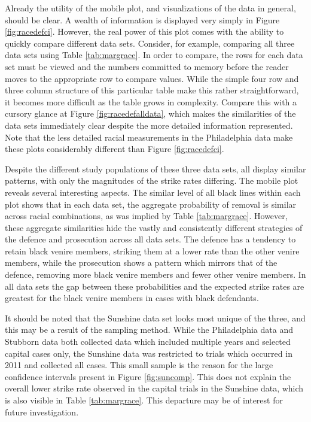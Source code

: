Already the utility of the mobile plot, and visualizations of the data in general, should be clear. A wealth of information is
displayed very simply in Figure \ref{fig:racedefci}. However, the real power of this plot comes with the ability to quickly
compare different data sets. Consider, for example, comparing all three data sets
using Table \ref{tab:margrace}. In order to compare, the rows for each data set must be viewed and the numbers
committed to memory before the reader moves to the appropriate row to compare values. While the simple four row and three column
structure of this particular table make this rather straightforward,
it becomes more difficult as the table grows
in complexity. Compare this with a cursory glance at Figure \ref{fig:racedefalldata}, which makes the similarities of the data
sets immediately clear despite the more detailed information
represented. Note that the less detailed racial measurements in the Philadelphia data make these plots considerably different than Figure \ref{fig:racedefci}.

Despite the different study populations of these three data sets, all display similar patterns, with only the
magnitudes of the strike rates differing. The mobile plot reveals several interesting aspects. The similar level of all black lines within each plot shows that in each data set, the aggregate probability of removal is
similar across racial combinations, as was implied by Table \ref{tab:margrace}. However, these aggregate similarities
hide the vastly and consistently different strategies of the defence and prosecution across all data sets. The defence has a
tendency to retain black venire members, striking them at a lower rate
than the other venire members, while the
prosecution shows a pattern which mirrors that of the defence,
removing more black venire members and fewer other venire members. In
all data sets the gap between these probabilities and the expected strike rates are greatest for the black venire members in cases
with black defendants.

It should be noted that the Sunshine data set looks most unique of the three, and this may be a result of the sampling method. While
the Philadelphia data and Stubborn data both collected data which included multiple years and selected capital cases only, the Sunshine data was restricted to
trials which occurred in 2011 and collected all cases. This small sample is the reason for the large confidence intervals present in Figure
\ref{fig:suncomp}. This does not explain the overall lower strike rate observed in the capital trials in the Sunshine data, which is also
visible in Table \ref{tab:margrace}. This departure may be of interest for future investigation.

